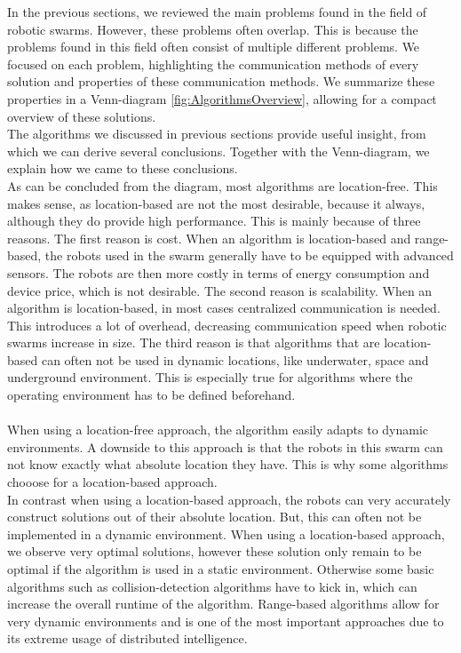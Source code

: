 
In the previous sections, we reviewed the main problems found in the field of robotic swarms. 
However, these problems often overlap.
This is because the problems found in this field often consist of multiple different problems. 
We focused on each problem, highlighting the communication methods of every solution and properties of these communication methods. 
We summarize these properties in a Venn-diagram \ref{fig:AlgorithmsOverview}, allowing for a compact overview of these solutions. \\
The algorithms we discussed in previous sections provide useful insight, from which we can derive several conclusions.
Together with the Venn-diagram, we explain how we came to these conclusions. \\



As can be concluded from the diagram, most algorithms are location-free.
This makes sense, as location-based are not the most desirable, because it always, although they do provide high performance.
This is mainly because of three reasons. 
The first reason is cost. 
When an algorithm is location-based and range-based, the robots used in the swarm generally have to be equipped with advanced sensors. 
The robots are then more costly in terms of energy consumption and device price, which is not desirable.
The second reason is scalability. 
When an algorithm is location-based, in most cases centralized communication is needed. 
This introduces a lot of overhead, decreasing communication speed when robotic swarms increase in size. 
The third reason is that algorithms that are location-based can often not be used in dynamic locations, like underwater, space and underground environment.
This is especially true for algorithms where the operating environment has to be defined beforehand.\\
\\
When using a location-free approach, the algorithm easily adapts to dynamic environments.
A downside to this approach is that the robots in this swarm can not know exactly what absolute location they have.
This is why some algorithms chooose for a location-based approach. \\
In contrast when using a location-based approach, the robots can very accurately construct solutions out of their absolute location. 
But, this can often not be implemented in a dynamic environment. 
When using a location-based approach, we observe very optimal solutions, however these solution only remain to be optimal if the algorithm is used in a static environment. 
Otherwise some basic algorithms such as collision-detection algorithms have to kick in, which can increase the overall runtime of the algorithm. Range-based algorithms allow for very dynamic environments and is one of the most important approaches due to its extreme usage of distributed intelligence. 

